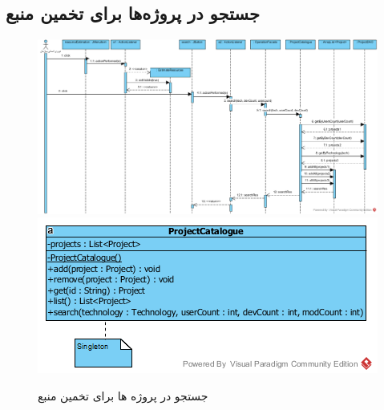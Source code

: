 \begin{landscape}
\section{جستجو در پروژه‌ها برای تخمین منبع}
\begin{figure}[H]
	\centering
	\includegraphics[scale=0.6]{img/sequence-design/SearchInProjects}
	\includegraphics[scale=0.7]{img/sequence-design/SearchInProjectsC}
	\caption{جستجو در پروژه ها برای تخمین منبع}
\end{figure}


\end{landscape}
